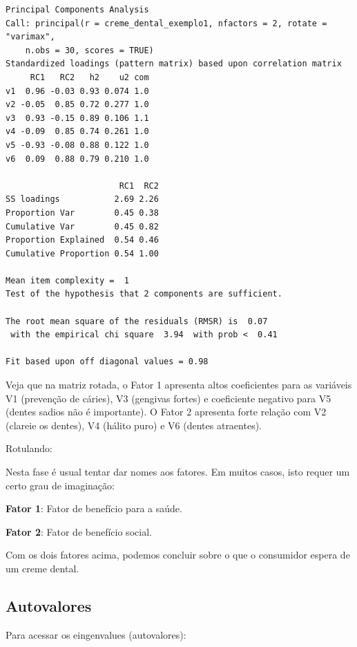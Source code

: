 \documentclass[12pt,brazil,oneside]{book}
\newenvironment{Shaded}{\begin{snugshade}}{\end{snugshade}}
\newcommand{\NormalTok}[1]{#1}
\newcommand{\OperatorTok}[1]{\textcolor[rgb]{0.81,0.36,0.00}{\textbf{#1}}}
\begin{document}
\begin{verbatim}
Principal Components Analysis
Call: principal(r = creme_dental_exemplo1, nfactors = 2, rotate = "varimax", 
    n.obs = 30, scores = TRUE)
Standardized loadings (pattern matrix) based upon correlation matrix
     RC1   RC2   h2    u2 com
v1  0.96 -0.03 0.93 0.074 1.0
v2 -0.05  0.85 0.72 0.277 1.0
v3  0.93 -0.15 0.89 0.106 1.1
v4 -0.09  0.85 0.74 0.261 1.0
v5 -0.93 -0.08 0.88 0.122 1.0
v6  0.09  0.88 0.79 0.210 1.0

                       RC1  RC2
SS loadings           2.69 2.26
Proportion Var        0.45 0.38
Cumulative Var        0.45 0.82
Proportion Explained  0.54 0.46
Cumulative Proportion 0.54 1.00

Mean item complexity =  1
Test of the hypothesis that 2 components are sufficient.

The root mean square of the residuals (RMSR) is  0.07 
 with the empirical chi square  3.94  with prob <  0.41 

Fit based upon off diagonal values = 0.98
\end{verbatim}

Veja que na matriz rotada, o Fator 1 apresenta altos coeficientes para
as variáveis V1 (prevenção de cáries), V3 (gengivas fortes) e
coeficiente negativo para V5 (dentes sadios não é importante). O Fator 2
apresenta forte relação com V2 (clareie os dentes), V4 (hálito puro) e
V6 (dentes atraentes).

Rotulando:

Nesta fase é usual tentar dar nomes aos fatores. Em muitos casos, isto
requer um certo grau de imaginação:

\textbf{Fator 1}: Fator de benefício para a saúde.

\textbf{Fator 2}: Fator de benefício social.

Com os dois fatores acima, podemos concluir sobre o que o consumidor
espera de um creme dental.

\hypertarget{autovalores-1}{%
\subsection{Autovalores}\label{autovalores-1}}

Para acessar os eingenvalues (autovalores):

\begin{Shaded}
\end{Shaded}
\end{document}
